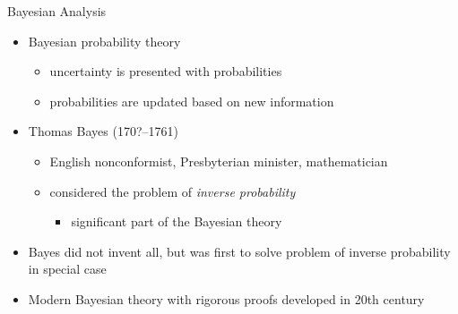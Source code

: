 \documentclass[10pt]{beamer}
\begin{document}
\begin{frame}{Bayesian Analysis}

  \begin{itemize}
  \item Bayesian probability theory
    \begin{itemize}
    \item uncertainty is presented with probabilities
    \item probabilities are updated based on new information
    \end{itemize}
    \pause
    \item Thomas Bayes (170?--1761)
    \begin{itemize}
    \item English nonconformist, Presbyterian minister,
      mathematician
    \item considered the problem of {\it inverse probability}
      \begin{itemize}
        \item significant part of the Bayesian theory
      \end{itemize}
  \end{itemize}
  \pause
  \item Bayes did not invent all, but was first to solve problem of
    inverse probability in special case
  \item Modern Bayesian theory with rigorous proofs developed in
    20th century
\end{itemize}
\end{frame}
\end{document}
